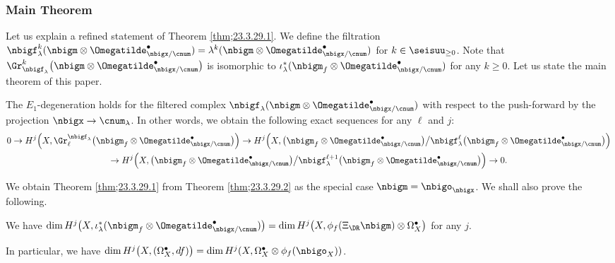 \documentclass[a4,10pt]{article}
\begin{document}
\subsubsection{Main Theorem}


Let us explain a refined statement
of Theorem \ref{thm;23.3.29.1}.
We define the filtration
$\nbigf_{\lambda}^k(\nbigm\otimes\Omegatilde^{\bullet}_{\nbigx/\cnum})
=\lambda^k
(\nbigm\otimes\Omegatilde^{\bullet}_{\nbigx/\cnum})$
for $k\in\seisuu_{\geq 0}$.
Note that
$\Gr_{\nbigf_{\lambda}}^k\bigl(
 \nbigm\otimes\Omegatilde^{\bullet}_{\nbigx/\cnum}
\bigr)$
is isomorphic to 
$\iota_{\lambda}^{\ast}(\nbigm_f\otimes\Omegatilde^{\bullet}_{\nbigx/\cnum})$
for any $k\geq 0$.
Let us state the main theorem of this paper.

\begin{thm}
\label{thm;23.3.29.2}
The $E_1$-degeneration holds
for the filtered complex
$\nbigf_{\lambda}(\nbigm\otimes\Omegatilde^{\bullet}_{\nbigx/\cnum})$
with respect to the push-forward by
the projection $\nbigx\to\cnum_{\lambda}$.
In other words,
we obtain the following exact sequences
for any $\ell$  and $j$:
\begin{multline}
\label{eq;25.6.30.1}
 0\to
 H^j\Bigl(
 X,
 \Gr^{\nbigf_{\lambda}}_{\ell}
 \bigl(
\nbigm_f\otimes\Omegatilde^{\bullet}_{\nbigx/\cnum}
\bigr)
 \Bigr)
 \to
  H^j\Bigl(
 X,
 \bigl(
\nbigm_f\otimes\Omegatilde^{\bullet}_{\nbigx/\cnum}
 \bigr)\big/
 \nbigf_{\lambda}^{\ell}\bigl(
\nbigm_f\otimes\Omegatilde^{\bullet}_{\nbigx/\cnum}
 \bigr)
 \Bigr)
\\
 \to
  H^j\Bigl(
 X,
 \bigl(
\nbigm_f\otimes\Omegatilde^{\bullet}_{\nbigx/\cnum}
 \bigr)\big/
 \nbigf_{\lambda}^{\ell+1}\bigl(
\nbigm_f\otimes\Omegatilde^{\bullet}_{\nbigx/\cnum}
 \bigr)
 \Bigr)
\to 0.
\end{multline} 
\end{thm}
We obtain Theorem \ref{thm;23.3.29.1}
from Theorem \ref{thm;23.3.29.2}
as the special case $\nbigm=\nbigo_{\nbigx}$.
We shall also prove the following.
\begin{thm}
We have
$\dim H^j\bigl(X,
\iota_{\lambda}^{\ast}(\nbigm_f\otimes\Omegatilde^{\bullet}_{\nbigx/\cnum})
\bigr)
=\dim H^{j}\bigl(
X,\phi_f(\Xi_{\DR}\nbigm)\otimes
\Omega^{\bullet}_X
\bigr)$
for any $j$.
\end{thm}
\begin{cor}
In particular,
we have 
$\dim H^j\bigl(X,
 (\Omega^{\bullet}_X,df)
 \bigr)
 =\dim H^{j}(X,\Omega^{\bullet}_X\otimes
 \phi_f(\nbigo_X))$.
\end{cor} 
\end{document}
